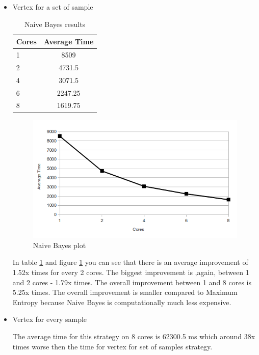 \documentclass{report}
\begin{document}
\begin{itemize}

\item{Vertex for a set of sample}

\begin{table}[ht]
\centering
\begin{tabular}{ l c }
    \hline\hline
    Cores & Average Time \\ [0.2ex]
    \hline
    1 & 8509 \\
    2 & 4731.5  \\
    4 & 3071.5  \\
    6 & 2247.25  \\
    8 & 1619.75  \\
    \hline
  \end{tabular}
\label{table:naiveres1}
\caption{Naive Bayes results}
\end{table}

\begin{figure}[!htb]
  \centering
  \includegraphics*[scale=0.70]{naivebayes_plot.png}
  \caption{Naive Bayes plot}
  \label{fig:naive_plot}
\end{figure}

In table \ref{table:naiveres1} and figure \ref{fig:naive_plot} you can see that there is an average improvement of 1.52x times for every 2 cores. The biggest improvement is ,again, between 1 and 2 cores - 1.79x times. The overall improvement between 1 and 8 cores is 5.25x times. The overall improvement is smaller compared to Maximum Entropy because Naive Bayes is computationally much less expensive.

\item{Vertex for every sample}

The average time for this strategy on 8 cores is 62300.5 ms which around 38x times worse then the time for vertex for set of samples strategy.


\end{itemize}
\end{document}
